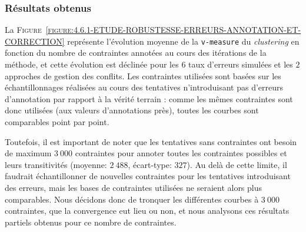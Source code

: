 		\subsubsection{Résultats obtenus}
		
			La \textsc{Figure~\ref{figure:4.6.1-ETUDE-ROBUSTESSE-ERREURS-ANNOTATION-ET-CORRECTION}} représente l'évolution moyenne de la \texttt{v-measure} du \textit{clustering} en fonction du nombre de contraintes annotées au cours des itérations de la méthode, et cette évolution est déclinée pour les $6$ taux d'erreurs simulées et les $2$ approches de gestion des conflits.
			Les contraintes utilisées sont basées sur les échantillonnages réalisées au cours des tentatives n'introduisant pas d'erreurs d'annotation par rapport à la vérité terrain : comme les mêmes contraintes sont donc utilisées (aux valeurs d'annotations près), toutes les courbes sont comparables point par point.
			
			\begin{leftBarWarning}
				Toutefois, il est important de noter que les tentatives sans contraintes ont besoin de maximum $3~000$ contraintes pour annoter toutes les contraintes possibles et leurs transitivités (moyenne: $2~488$, écart-type: $327$).
				Au delà de cette limite, il faudrait échantillonner de nouvelles contraintes pour les tentatives introduisant des erreurs, mais les bases de contraintes utilisées ne seraient alors plus comparables.
				Nous décidons donc de tronquer les différentes courbes à $3~000$ contraintes, que la convergence eut lieu ou non, et nous analysons ces résultats partiels obtenus pour ce nombre de contraintes.
			\end{leftBarWarning}
			
